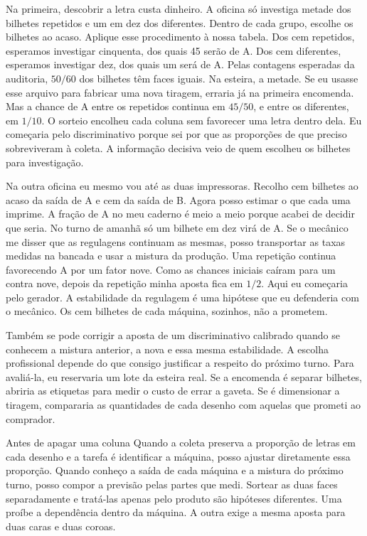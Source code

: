 Na primeira, descobrir a letra custa dinheiro. A oficina só investiga metade dos bilhetes repetidos e um em dez dos diferentes. Dentro de cada grupo, escolhe os bilhetes ao acaso. Aplique esse procedimento à nossa tabela. Dos cem repetidos, esperamos investigar cinquenta, dos quais 45 serão de A. Dos cem diferentes, esperamos investigar dez, dos quais um será de A. Pelas contagens esperadas da auditoria, $50/60$ dos bilhetes têm faces iguais. Na esteira, a metade. Se eu usasse esse arquivo para fabricar uma nova tiragem, erraria já na primeira encomenda. Mas a chance de A entre os repetidos continua em $45/50$, e entre os diferentes, em $1/10$. O sorteio encolheu cada coluna sem favorecer uma letra dentro dela. Eu começaria pelo discriminativo porque sei por que as proporções de que preciso sobreviveram à coleta. A informação decisiva veio de quem escolheu os bilhetes para investigação.

Na outra oficina eu mesmo vou até as duas impressoras. Recolho cem bilhetes ao acaso da saída de A e cem da saída de B. Agora posso estimar o que cada uma imprime. A fração de A no meu caderno é meio a meio porque acabei de decidir que seria. No turno de amanhã só um bilhete em dez virá de A. Se o mecânico me disser que as regulagens continuam as mesmas, posso transportar as taxas medidas na bancada e usar a mistura da produção. Uma repetição continua favorecendo A por um fator nove. Como as chances iniciais caíram para um contra nove, depois da repetição minha aposta fica em $1/2$. Aqui eu começaria pelo gerador. A estabilidade da regulagem é uma hipótese que eu defenderia com o mecânico. Os cem bilhetes de cada máquina, sozinhos, não a prometem.

Também se pode corrigir a aposta de um discriminativo calibrado quando se conhecem a mistura anterior, a nova e essa mesma estabilidade. A escolha profissional depende do que consigo justificar a respeito do próximo turno. Para avaliá-la, eu reservaria um lote da esteira real. Se a encomenda é separar bilhetes, abriria as etiquetas para medir o custo de errar a gaveta. Se é dimensionar a tiragem, compararia as quantidades de cada desenho com aquelas que prometi ao comprador.

\begin{quadro}{Antes de apagar uma coluna}
 Quando a coleta preserva a proporção de letras em cada desenho e a tarefa é identificar a máquina, posso ajustar diretamente essa proporção. Quando conheço a saída de cada máquina e a mistura do próximo turno, posso compor a previsão pelas partes que medi.
 Sortear as duas faces separadamente e tratá-las apenas pelo produto são hipóteses diferentes. Uma proíbe a dependência dentro da máquina. A outra exige a mesma aposta para duas caras e duas coroas.
\end{quadro}

